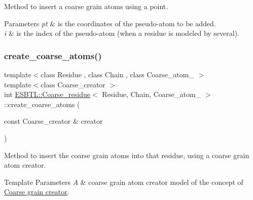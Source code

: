 Method to insert a coarse grain atoms using a point. 
\begin{DoxyParams}{Parameters}
{\em pt} & is the coordinates of the pseudo-\/atom to be added. \\
\hline
{\em i} & is the index of the pseudo-\/atom (when a residue is modeled by several). \\
\hline
\end{DoxyParams}
\mbox{\label{classESBTL_1_1Coarse__residue_a4a514a6142ad550ade5df531f08d9cdd}} 
\subsubsection{\texorpdfstring{create\+\_\+coarse\+\_\+atoms()}{create\_coarse\_atoms()}}
{\footnotesize\ttfamily template$<$class Residue , class Chain , class Coarse\+\_\+atom\+\_\+ $>$ \\
template$<$class Coarse\+\_\+creator $>$ \\
int \hyperlink{classESBTL_1_1Coarse__residue}{E\+S\+B\+T\+L\+::\+Coarse\+\_\+residue}$<$ Residue, Chain, Coarse\+\_\+atom\+\_\+ $>$\+::create\+\_\+coarse\+\_\+atoms (\begin{DoxyParamCaption}\item[{const Coarse\+\_\+creator \&}]{creator }\end{DoxyParamCaption})\hspace{0.3cm}{\ttfamily [inline]}}

Method to insert the coarse grain atoms into that residue, using a coarse grain atom creator. 
\begin{DoxyTemplParams}{Template Parameters}
{\em A} & coarse grain atom creator model of the concept of \hyperlink{group__coarse__creator}{Coarse grain creator}. \\
\hline
\end{DoxyTemplParams}
\mbox{\label{classESBTL_1_1Coarse__residue_a85c3825ca10ace200a4f2d4d626a81b0}} 
